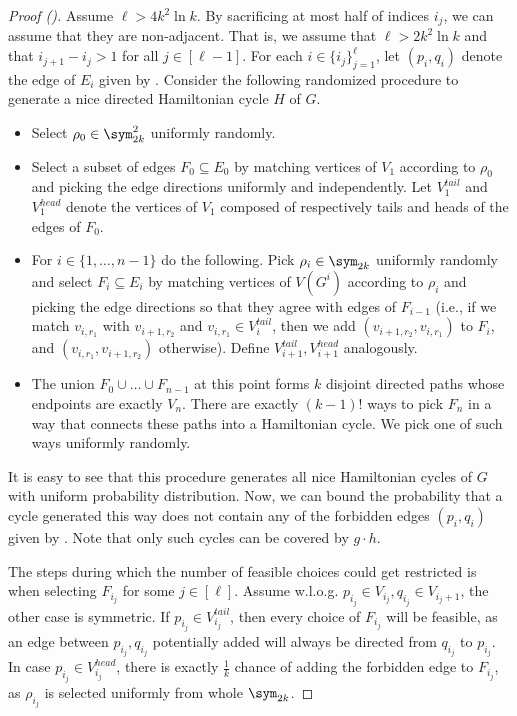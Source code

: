\begin{proof}[Proof ()]
    Assume $\ell > 4k^2 \ln k$. By sacrificing at most half of indices $i_j$, we can assume that they are non-adjacent. That is, we assume that $\ell > 2k^2 \ln k$ and that $i_{j + 1} - i_j > 1$ for all $j \in [\ell - 1]$. For each $i \in \{i_j\}_{j=1}^\ell$, let $(p_i, q_i)$ denote the edge of $E_i$ given by .
    Consider the following randomized procedure to generate a nice directed Hamiltonian cycle $H$ of $G$.
    \begin{itemize}
        \item Select $\rho_0 \in \sym_{2k}^2$ uniformly randomly.
        \item Select a subset of edges $F_0 \subseteq E_0$ by matching vertices of $V_1$ according to $\rho_0$ and picking the edge directions uniformly and independently. Let $V_1^{tail}$ and $V_1^{head}$ denote the vertices of $V_1$ composed of respectively tails and heads of the edges of $F_0$.
        \item For $i \in \{1, \dots, n - 1\}$ do the following. Pick $\rho_i \in \sym_{2k}$ uniformly randomly and select $F_i \subseteq E_i$ by matching vertices of $V(G^i)$ according to $\rho_i$ and picking the edge directions so that they agree with edges of $F_{i - 1}$ (i.e., if we match $v_{i, r_1}$ with $v_{i + 1, r_2}$ and $v_{i, r_1} \in V_i^{tail}$, then we add $(v_{i + 1, r_2}, v_{i, r_1})$ to $F_i$, and $(v_{i, r_1}, v_{i + 1, r_2})$ otherwise). Define $V_{i + 1}^{tail}, V_{i + 1}^{head}$ analogously.
        \item The union $F_0 \cup \dots \cup F_{n - 1}$ at this point forms $k$ disjoint directed paths whose endpoints are exactly $V_n$. There are exactly $(k - 1)!$ ways to pick $F_n$ in a way that connects these paths into a Hamiltonian cycle. We pick one of such ways uniformly randomly.
    \end{itemize}
    It is easy to see that this procedure generates all nice Hamiltonian cycles of $G$ with uniform probability distribution. Now, we can bound the probability that a cycle generated this way does not contain any of the forbidden edges $(p_i, q_i)$ given by . Note that only such cycles can be covered by $g \cdot h$.

    The steps during which the number of feasible choices could get restricted is when selecting $F_{i_j}$ for some $j \in [\ell]$. Assume w.l.o.g. $p_{i_j} \in V_{i_j}, q_{i_j} \in V_{i_j + 1}$, the other case is symmetric. If $p_{i_j} \in V_{i_j}^{tail}$, then every choice of $F_{i_j}$ will be feasible, as an edge between $p_{i_j}, q_{i_j}$ potentially added will always be directed from $q_{i_j}$ to $p_{i_j}$. In case $p_{i_j} \in V_{i_j}^{head}$, there is exactly $\frac{1}{k}$ chance of adding the forbidden edge to $F_{i_j}$, as $\rho_{i_j}$ is selected uniformly from whole $\sym_{2k}$.


\end{proof}
